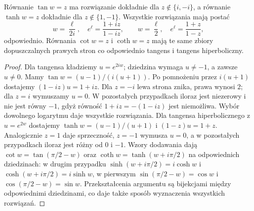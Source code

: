 \begin{twierdzenie}
\label{ma2:thm:complex-inverse-ratios}
Równanie $\tan w=z$ ma rozwiązanie dokładnie dla
$z\notin\{i,-i\}$, a równanie $\tanh w=z$ dokładnie dla
$z\notin\{1,-1\}$. Wszystkie rozwiązania mają postać
\[
 w=\frac{\ell}{2i},\quad e^\ell=\frac{1+iz}{1-iz},
 \qquad
 w=\frac{\ell}{2},\quad e^\ell=\frac{1+z}{1-z},
\]
odpowiednio. Równania $\cot w=z$ i $\coth w=z$
mają te same zbiory dopuszczalnych prawych stron co
odpowiednio tangens i tangens hiperboliczny.
\end{twierdzenie}
\begin{proof}
Dla tangensa kładziemy $u=e^{2iw}$; dziedzina wymaga
$u\ne-1$, a zawsze $u\ne0$. Mamy
$\tan w=(u-1)/(i(u+1))$. Po pomnożeniu przez
$i(u+1)$ dostajemy $(1-iz)u=1+iz$.
Dla $z=-i$ lewa strona znika, prawa wynosi $2$;
dla $z=i$ wymuszamy $u=0$. W pozostałych przypadkach
iloraz jest niezerowy i nie jest równy $-1$,
gdyż równość $1+iz=-(1-iz)$ jest niemożliwa.
Wybór dowolnego logarytmu daje wszystkie rozwiązania.
Dla tangensa hiperbolicznego z $u=e^{2w}$ dostajemy
$\tanh w=(u-1)/(u+1)$ i $(1-z)u=1+z$.
Analogicznie $z=1$ daje sprzeczność, $z=-1$ wymusza
$u=0$, a w pozostałych przypadkach iloraz jest różny
od $0$ i $-1$.
Wzory dodawania dają $\cot w=\tan(\pi/2-w)$
oraz $\coth w=\tanh(w+i\pi/2)$ na odpowiednich
dziedzinach: w drugim przypadku
$\sinh(w+i\pi/2)=i\cosh w$ i
$\cosh(w+i\pi/2)=i\sinh w$, w pierwszym
$\sin(\pi/2-w)=\cos w$ i
$\cos(\pi/2-w)=\sin w$.
Przekształcenia argumentu są bijekcjami między
odpowiednimi dziedzinami, co daje także sposób
wyznaczenia wszystkich rozwiązań.
\end{proof}

